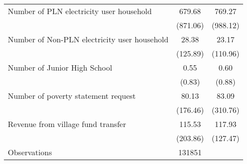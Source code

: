 \begin{tabular}{l*{2}{c}}
\hspace{0.25cm} Number of PLN electricity user household&      679.68&      769.27\\
                    &    (871.06)&    (988.12)\\
\hspace{0.25cm} Number of Non-PLN electricity user household&       28.38&       23.17\\
                    &    (125.89)&    (110.96)\\
\hspace{0.25cm} Number of Junior High School&        0.55&        0.60\\
                    &      (0.83)&      (0.88)\\
\hspace{0.25cm} Number of poverty statement request&       80.13&       83.09\\
                    &    (176.46)&    (310.76)\\
\hspace{0.25cm} Revenue from village fund transfer&      115.53&      117.93\\
                    &    (203.86)&    (127.47)\\
\hline
Observations        &      131851&            \\
\hline\hline
\end{tabular}
